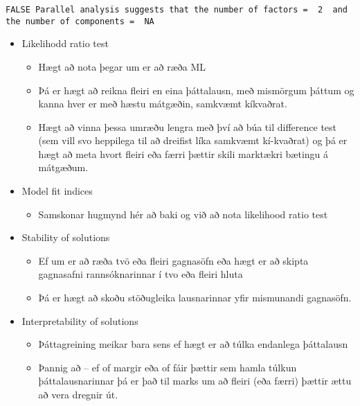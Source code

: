 \documentclass[]{book}
\providecommand{\tightlist}{%
  \setlength{\itemsep}{0pt}\setlength{\parskip}{0pt}}
\begin{document}
\begin{verbatim}
FALSE Parallel analysis suggests that the number of factors =  2  and the number of components =  NA
\end{verbatim}

\begin{itemize}
\tightlist
\item
  Likelihodd ratio test

  \begin{itemize}
  \tightlist
  \item
    Hægt að nota þegar um er að ræða ML
  \item
    Þá er hægt að reikna fleiri en eina þáttalausn, með mismörgum þáttum og kanna hver er með hæstu mátgæðin, samkvæmt kíkvaðrat.
  \item
    Hægt að vinna þessa umræðu lengra með því að búa til difference test (sem vill svo heppilega til að dreifist líka samkvæmt kí-kvaðrat) og þá er hægt að meta hvort fleiri eða færri þættir skili marktækri bætingu á mátgæðum.
  \end{itemize}
\item
  Model fit indices

  \begin{itemize}
  \tightlist
  \item
    Samskonar hugmynd hér að baki og við að nota likelihood ratio test
  \end{itemize}
\item
  Stability of solutions

  \begin{itemize}
  \tightlist
  \item
    Ef um er að ræða tvö eða fleiri gagnasöfn eða hægt er að skipta gagnasafni rannsóknarinnar í tvo eða fleiri hluta
  \item
    Þá er hægt að skoðu stöðugleika lausnarinnar yfir mismunandi gagnasöfn.
  \end{itemize}
\item
  Interpretability of solutions

  \begin{itemize}
  \tightlist
  \item
    Þáttagreining meikar bara sens ef hægt er að túlka endanlega þáttalausn
  \item
    Þannig að -- ef of margir eða of fáir þættir sem hamla túlkun þáttalausnarinnar þá er það til marks um að fleiri (eða færri) þættir ættu að vera dregnir út.
  \end{itemize}
\end{itemize}
\end{document}
